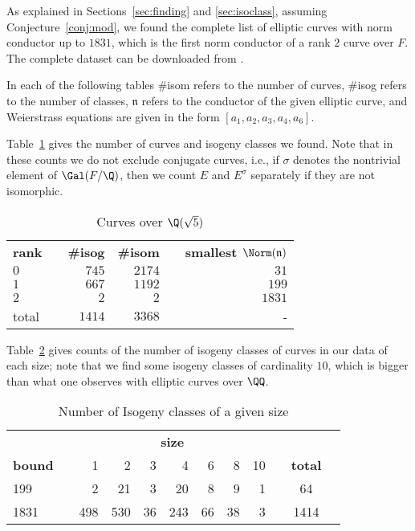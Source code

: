 \documentclass{amsart}
\newcommand{\n}{\mathfrak{n}}
\begin{document}
As explained in Sections~\ref{sec:finding} and \ref{sec:isoclass},
assuming Conjecture~\ref{conj:mod}, we found the complete list of
elliptic curves with norm conductor up to $1831$, which is the first
norm conductor of a rank $2$ curve over $F$. The complete
dataset can be downloaded from \cite{sqrt5data}.

In each of the following tables \#isom refers to the number of curves, \#isog
refers to the number of classes, $\n$ refers to the conductor of the
given elliptic curve, and Weierstrass equations are given in the form
$[a_1,a_2,a_3,a_4,a_6]$.

Table~\ref{table:total-counts} gives the number of curves and isogeny
classes we found. Note that in these counts we do not exclude
conjugate curves, i.e., if $\sigma$ denotes the nontrivial element of
$\Gal(F/\Q)$, then we count $E$ and $E^{\sigma}$ separately if they
are not isomorphic.
\begin{center}
\begin{table}[h]
\caption{Curves over $\Q(\sqrt{5})$\label{table:total-counts}}
\begin{tabular}{@{}lcrrcr@{}}\toprule
\textbf{rank} & \phantom{a} &\textbf{\#isog} & \textbf{\#isom} & \phantom{a} & \textbf{smallest $\Norm(\n)$} \\\cmidrule{1-1}\cmidrule{3-4}\cmidrule{6-6}
$0$   & & $745$  & $2174$ & & $31$\\
$1$   & & $667$  & $1192$ & & $199$ \\
$2$   & & $2$    & $2$    & & $1831$ \\\cmidrule{1-6}
total & & $1414$ & $3368$ & & -\; \\\bottomrule
\end{tabular}
\end{table}
\end{center}

Table~\ref{table:isogeny-sizes} gives counts of the number of isogeny
classes of curves in our data of each size; note that we find some
isogeny classes of cardinality $10$, which is bigger than what one
observes with elliptic curves over $\QQ$.
\begin{center}
\begin{table}[h]
\caption{Number of Isogeny classes of a given size\label{table:isogeny-sizes}}
\begin{tabular}{@{}lcrrrrrrrrcr@{}}\toprule
& \phantom{a} & \multicolumn{7}{c}{\textbf{size}} & \phantom{a} & \\\cmidrule{3-9}
\textbf{bound} & & 1   & 2   & 3  & 4   & 6  & 8  & 10 & & \textbf{total} \\\midrule
199  & & 2   & 21  & 3  & 20  & 8  & 9  & 1  & & 64    \\
1831 & & 498 & 530 & 36 & 243 & 66 & 38 & 3  & & 1414  \\\bottomrule
\end{tabular}
\end{table}
\end{center}
\end{document}
